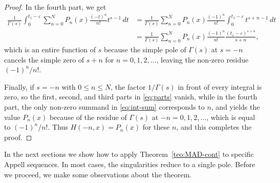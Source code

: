 \documentclass[11pt,a4paper]{amsart}
\newcommand{\eps}{\varepsilon}
\theoremstyle{plain}
\theoremstyle{plain}
\theoremstyle{remark}
\numberwithin{equation}{section}
\begin{document}
\begin{proof}
In the fourth part, we get
\begin{align}
\frac{1}{\Gamma(s)} \int_0^{t_1-\eps} \sum_{n=0}^N 
P_{n}(x) \frac{(-t)^n}{n!} t^{s-1} \,dt 
& = \frac{1}{\Gamma(s)} \sum_{n=0}^N P_{n}(x) \frac{(-1)^n}{n!}
\int_0^{t_1-\eps} t^{s+n-1} \,dt\nonumber \\ 
\label{eq:int-sum}
& = \frac{1}{\Gamma(s)}\sum_{n=0}^N P_{n}(x) 
\frac{(-1)^n}{n!} \frac{(t_1-\eps)^{s+n}}{s+n},
\end{align}
which is an entire function of $s$ because the simple pole of $\Gamma(s)$ at $s = -n$ cancels the simple zero of $s+n$ for $n=0,1,2,\dots$, leaving the non-zero residue $(-1)^n/n!$. 

Finally, if $s = -n$ with $0 \leq n \leq N$, the factor $1/\Gamma(s)$ in front of every integral is zero, so the first, second, and third parts in \eqref{eq:parts} vanish, while in the fourth part, the only non-zero summand in \eqref{eq:int-sum} corresponds to $n$, and yields the value $P_{n}(x)$ because of the residue of $\Gamma(s)$ at $-n = 0,1,2,\dots$, which is equal to $(-1)^n/n!$. Thus $H(-n,x) = P_{n}(x)$ for these $n$, and this completes the proof.
\end{proof}

In the next sections we show how to apply Theorem~\ref{teo:MAD-cont} to specific Appell sequences. In most cases, the singularities reduce to a single pole.
Before we proceed, we make some observations about the theorem.
\end{document}
